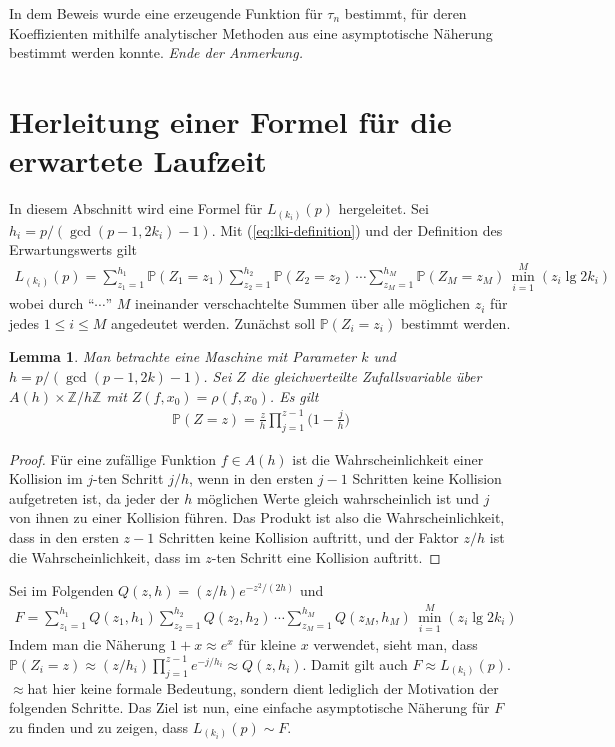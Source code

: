 \documentclass[a4paper, 11pt, ngerman]{article}
\newcommand{\Z}{\mathbb{Z}}
\renewcommand{\P}{\mathbb{P}}
\theoremstyle{definition}
\theoremstyle{plain}
\newtheorem{lemma}{Lemma}
\theoremstyle{remark}
\begin{document}
In dem Beweis wurde eine erzeugende Funktion für $\tau_n$ bestimmt, für deren Koeffizienten mithilfe analytischer Methoden aus \cite{fo90} eine asymptotische Näherung bestimmt werden konnte. \emph{Ende der Anmerkung.}

\section{Herleitung einer Formel für die erwartete Laufzeit}
\label{sec:formula-running-time}

In diesem Abschnitt wird eine Formel für $L_{(k_i)}(p)$ hergeleitet. Sei $h_i = p/(\gcd(p - 1, 2k_i) - 1)$. Mit (\ref{eq:lki-definition}) und der Definition des Erwartungswerts gilt
\begin{align}
    L_{(k_i)}(p) =
    \sum_{z_1 = 1}^{h_1} \P(Z_1 = z_1)
    \sum_{z_2 = 1}^{h_2} \P(Z_2 = z_2) \, \cdots
    \sum_{z_M = 1}^{h_M} \P(Z_M = z_M)
    \, \min_{i = 1}^M(z_i \lg 2k_i)
    \label{eq:lki-written-out}
\end{align}
wobei durch "`$\cdots$"' $M$ ineinander verschachtelte Summen über alle möglichen $z_i$ für jedes $1 \le i \le M$ angedeutet werden. Zunächst soll $\P(Z_i = z_i)$ bestimmt werden.

\begin{lemma}
    Man betrachte eine Maschine mit Parameter $k$ und $h = p/(\gcd(p - 1, 2k) - 1)$. Sei $Z$ die gleichverteilte Zufallsvariable über $A(h) \times \Z/h\Z$ mit $Z(f, x_0) = \rho(f, x_0)$. Es gilt
    \begin{align*}
        \P(Z = z) = \frac z h \prod_{j = 1}^{z - 1} \bigg (1 - \frac j h \bigg )
    \end{align*}

    \label{lemma:prob-s-z}
\end{lemma}

\begin{proof}
    Für eine zufällige Funktion $f \in A(h)$ ist die Wahrscheinlichkeit einer Kollision im $j$-ten Schritt $j/h$, wenn in den ersten $j - 1$ Schritten keine Kollision aufgetreten ist, da jeder der $h$ möglichen Werte gleich wahrscheinlich ist und $j$ von ihnen zu einer Kollision führen. Das Produkt ist also die Wahrscheinlichkeit, dass in den ersten $z - 1$ Schritten keine Kollision auftritt, und der Faktor $z/h$ ist die Wahrscheinlichkeit, dass im $z$-ten Schritt eine Kollision auftritt.
\end{proof}

Sei im Folgenden $Q(z, h) = (z/h) e^{-z^2/(2h)}$ und
\begin{align}
    F =
    \sum_{z_1 = 1}^{h_1} Q(z_1, h_1)
    \sum_{z_2 = 1}^{h_2} Q(z_2, h_2) \, \cdots
    \sum_{z_M = 1}^{h_M} Q(z_M, h_M)
    \, \min_{i = 1}^M(z_i \lg 2k_i)
    \label{eq:f-definition}
\end{align}
Indem man die Näherung $1 + x \approx e^x$ für kleine $x$ verwendet, sieht man, dass $\P(Z_i = z) \approx (z/h_i) \prod_{j = 1}^{z - 1} e^{-j/h_i} \approx Q(z, h_i)$. Damit gilt auch $F \approx L_{(k_i)}(p)$. \glqq $\approx$\grqq \space hat hier keine formale Bedeutung, sondern dient lediglich der Motivation der folgenden Schritte. Das Ziel ist nun, eine einfache asymptotische Näherung für $F$ zu finden und zu zeigen, dass $L_{(k_i)}(p) \sim F$.
\end{document}
